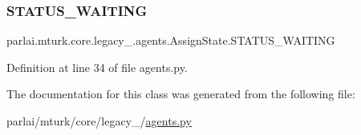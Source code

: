 \subsubsection{\texorpdfstring{S\+T\+A\+T\+U\+S\+\_\+\+W\+A\+I\+T\+I\+NG}{STATUS\_WAITING}}
{\footnotesize\ttfamily parlai.\+mturk.\+core.\+legacy\+\_.\+agents.\+Assign\+State.\+S\+T\+A\+T\+U\+S\+\_\+\+W\+A\+I\+T\+I\+NG\hspace{0.3cm}{\ttfamily [static]}}



Definition at line 34 of file agents.\+py.



The documentation for this class was generated from the following file\+:\begin{DoxyCompactItemize}
\item 
parlai/mturk/core/legacy\+\_/\hyperlink{parlai_2mturk_2core_2legacy__2018_2agents_8py}{agents.\+py}\end{DoxyCompactItemize}
